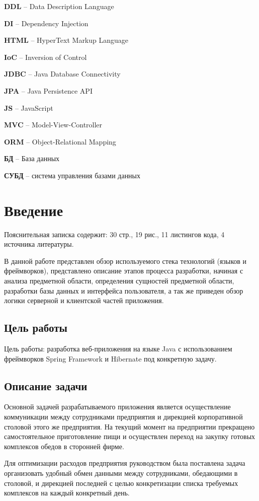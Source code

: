\documentclass[a4paper]{article}
\begin{document}
\textbf{DDL} – Data Description Language

\textbf{DI} – Dependency Injection

\textbf{HTML} – HyperText Markup Language

\textbf{IoC} – Inversion of Control

\textbf{JDBC} – Java Database Connectivity

\textbf{JPA} – Java Persistence API

\textbf{JS} – JavaScript

\textbf{MVC} – Model-View-Controller

\textbf{ORM} – Object-Relational Mapping

\textbf{БД} – База данных

\textbf{СУБД} – система управления базами данных

\newpage

\section{Введение}

Пояснительная записка содержит: 30 стр., 19 рис., 11 листингов кода, 4 источника
литературы. 

В данной работе представлен обзор используемого стека технологий (языков и
фреймворков), представлено описание этапов процесса разработки, начиная с
анализа предметной области, определения сущностей предметной области, разработки базы
данных и интерфейса пользователя, а так же приведен обзор логики серверной и клиентской
частей приложения.

\subsection{Цель работы}
Цель работы: разработка веб-приложения на языке Java с использованием фреймворков Spring Framework и Hibernate под конкретную задачу.

\subsection{Описание задачи}
Основной задачей разрабатываемого приложения является осуществление коммуникации между сотрудниками предприятия и дирекцией корпоративной столовой этого же предприятия. На текущий момент на предприятии прекращено самостоятельное приготовление пищи и осуществлен переход на закупку готовых комплексов обедов в сторонней фирме. 

Для оптимизации расходов предприятия руководством была поставлена задача организовать удобный обмен данными между сотрудниками, обедающими в столовой, и дирекцией последней с целью конкретизации списка требуемых комплексов на каждый конкретный день.
\end{document}
